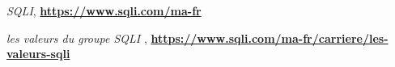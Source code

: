 
\renewcommand{\bibname}{Références}

\begin{thebibliography}{99}
    \emph{SQLI},
    \href{}{\textbf{https://www.sqli.com/ma-fr}}
    
    \emph{les valeurs du groupe SQLI },
    \href{https://www.sqli.com/ma-fr/carriere/les-valeurs-sqli}{\textbf{https://www.sqli.com/ma-fr/carriere/les-valeurs-sqli}}
    
    
    
  
     
     
     
     
     
     

     
    \end{thebibliography}